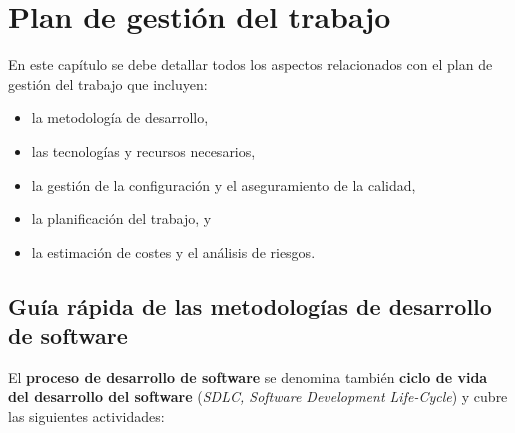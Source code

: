 \chapter{Plan de gestión del trabajo}\label{cap:Planificacion}
En este capítulo se debe detallar todos los aspectos relacionados con el plan de gestión del trabajo que incluyen: 
\begin{itemize}[noitemsep]
\item la metodología de desarrollo, 
\item las tecnologías y recursos necesarios, 
\item la gestión de la configuración y el aseguramiento de la calidad, 
\item la planificación del trabajo, y
\item la estimación de costes y el análisis de riesgos.
\end{itemize}

\section{Guía rápida de las metodologías de desarrollo de software}
El \textbf{proceso de desarrollo de software} se denomina también \textbf{ciclo de vida del desarrollo del software} (\emph{SDLC, Software Development Life-Cycle}) y cubre las siguientes actividades:

